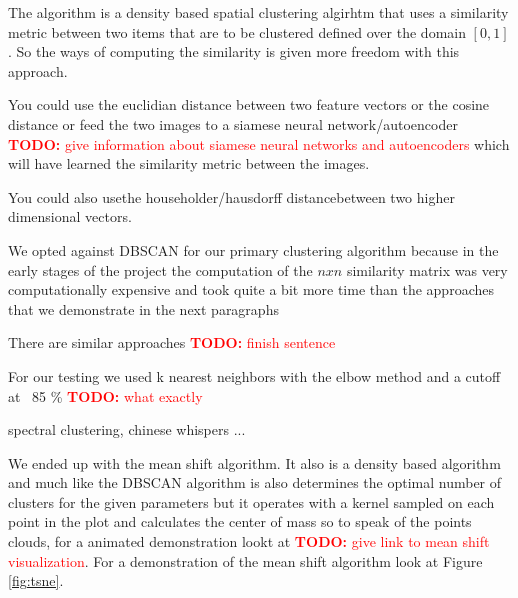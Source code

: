 \documentclass[journal]{vgtc}       %
\newcommand{\todo}[1]{\textcolor{red}{\textbf{TODO:} #1}}
\begin{document}
The algorithm is a density based spatial clustering algirhtm that uses a similarity metric between two items that are to be  clustered defined over the domain \([0,1]\). So the ways of computing the similarity is given more freedom with this approach.


You could use the euclidian distance between two feature vectors or the cosine distance or feed the two images to a siamese neural network/autoencoder \todo{give information about siamese neural networks and autoencoders} which will have learned the similarity metric between the images.

You could also usethe householder/hausdorff distancebetween two higher dimensional vectors.

We opted against DBSCAN for our primary clustering algorithm because in the early stages of the project the computation of the \(nxn\) similarity matrix was very computationally expensive and took quite a bit more time than the approaches that we demonstrate in the next paragraphs

There are similar approaches \todo{finish sentence}

For our testing we used k nearest neighbors with the elbow method and a cutoff at  ~85 \% \todo{what exactly}

spectral clustering, chinese whispers  ... 

We ended up with the mean shift algorithm. It also is a density based algorithm and much like the DBSCAN algorithm is also determines the optimal number of clusters for the given parameters but it operates with a kernel sampled on each point in the plot and calculates the center of mass so to speak of the points clouds, for a animated demonstration lookt at \todo{give link to mean shift visualization}. For a demonstration of the mean shift algorithm look at Figure \ref{fig:tsne}. 
\end{document}
